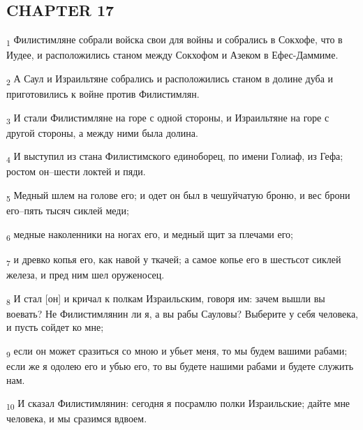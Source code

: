 \subsection{CHAPTER 17}
\begin{tcolorbox}
\textsubscript{1} Филистимляне собрали войска свои для войны и собрались в Сокхофе, что в Иудее, и расположились станом между Сокхофом и Азеком в Ефес-Даммиме.
\end{tcolorbox}
\begin{tcolorbox}
\textsubscript{2} А Саул и Израильтяне собрались и расположились станом в долине дуба и приготовились к войне против Филистимлян.
\end{tcolorbox}
\begin{tcolorbox}
\textsubscript{3} И стали Филистимляне на горе с одной стороны, и Израильтяне на горе с другой стороны, а между ними была долина.
\end{tcolorbox}
\begin{tcolorbox}
\textsubscript{4} И выступил из стана Филистимского единоборец, по имени Голиаф, из Гефа; ростом он--шести локтей и пяди.
\end{tcolorbox}
\begin{tcolorbox}
\textsubscript{5} Медный шлем на голове его; и одет он был в чешуйчатую броню, и вес брони его--пять тысяч сиклей меди;
\end{tcolorbox}
\begin{tcolorbox}
\textsubscript{6} медные наколенники на ногах его, и медный щит за плечами его;
\end{tcolorbox}
\begin{tcolorbox}
\textsubscript{7} и древко копья его, как навой у ткачей; а самое копье его в шестьсот сиклей железа, и пред ним шел оруженосец.
\end{tcolorbox}
\begin{tcolorbox}
\textsubscript{8} И стал [он] и кричал к полкам Израильским, говоря им: зачем вышли вы воевать? Не Филистимлянин ли я, а вы рабы Сауловы? Выберите у себя человека, и пусть сойдет ко мне;
\end{tcolorbox}
\begin{tcolorbox}
\textsubscript{9} если он может сразиться со мною и убьет меня, то мы будем вашими рабами; если же я одолею его и убью его, то вы будете нашими рабами и будете служить нам.
\end{tcolorbox}
\begin{tcolorbox}
\textsubscript{10} И сказал Филистимлянин: сегодня я посрамлю полки Израильские; дайте мне человека, и мы сразимся вдвоем.
\end{tcolorbox}

